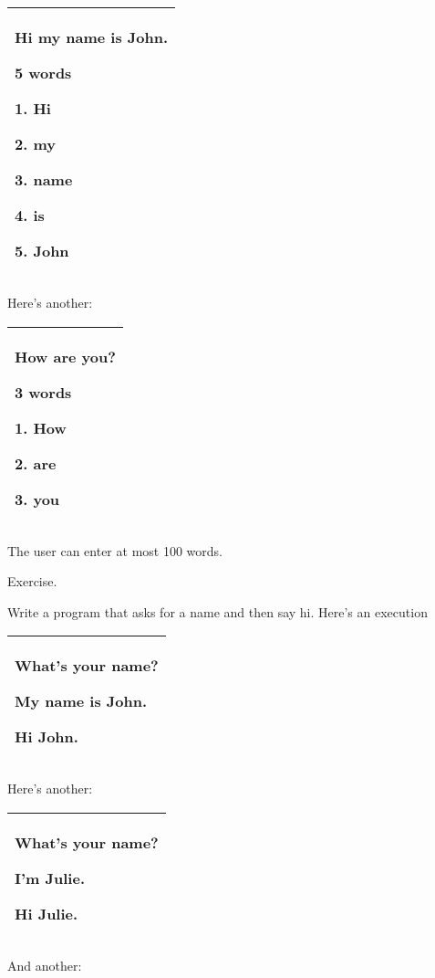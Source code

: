 \documentclass[
]{article}
\begin{document}
\begin{longtable}[]{@{}l@{}}
\toprule
\endhead
\begin{minipage}[t]{0.97\columnwidth}\raggedright
Hi my name is John.

5 words

1. Hi

2. my

3. name

4. is

5. John\strut
\end{minipage}\tabularnewline
\bottomrule
\end{longtable}

Here's another:

\begin{longtable}[]{@{}l@{}}
\toprule
\endhead
\begin{minipage}[t]{0.97\columnwidth}\raggedright
How are you?

3 words

1. How

2. are

3. you\strut
\end{minipage}\tabularnewline
\bottomrule
\end{longtable}

The user can enter at most 100 words.

Exercise.

Write a program that asks for a name and then say hi. Here's an
execution

\begin{longtable}[]{@{}l@{}}
\toprule
\endhead
\begin{minipage}[t]{0.97\columnwidth}\raggedright
What's your name?

My name is John.

Hi John.\strut
\end{minipage}\tabularnewline
\bottomrule
\end{longtable}

Here's another:

\begin{longtable}[]{@{}l@{}}
\toprule
\endhead
\begin{minipage}[t]{0.97\columnwidth}\raggedright
What's your name?

I'm Julie.

Hi Julie.\strut
\end{minipage}\tabularnewline
\bottomrule
\end{longtable}

And another:
\end{document}
